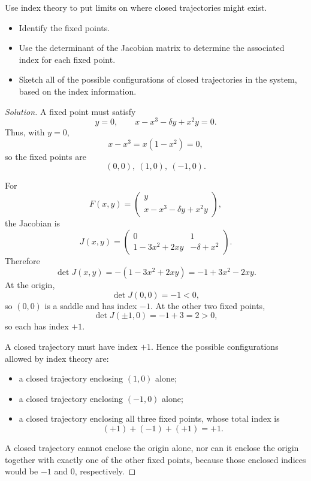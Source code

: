 \documentclass[12pt]{amsart}
\theoremstyle{plain}
\theoremstyle{definition}
\theoremstyle{definition}
\theoremstyle{plain}
\newenvironment{solution}
{\begin{proof}[Solution]}
{\end{proof}}
\begin{document}
\begin{enumerate}[label=\arabic*.]
        Use index theory to put limits on where closed trajectories might exist.
        \begin{itemize}
            \item Identify the fixed points.
            \item Use the determinant of the Jacobian matrix to determine the associated index
            for each fixed point.
            \item Sketch all of the possible configurations of closed trajectories in the system,
            based on the index information.
        \end{itemize}

        \begin{solution}
            A fixed point must satisfy
            \[
                y=0,
                \qquad
                x-x^3-\delta y+x^2y=0.
            \]
            Thus, with $y=0$,
            \[
                x-x^3=x(1-x^2)=0,
            \]
            so the fixed points are
            \[
                (0,0),\ (1,0),\ (-1,0).
            \]

            For
            \[
                F(x,y)=
                \begin{pmatrix}
                    y\\
                    x-x^3-\delta y+x^2y
                \end{pmatrix},
            \]
            the Jacobian is
            \[
                J(x,y)=
                \begin{pmatrix}
                    0 & 1\\
                    1-3x^2+2xy & -\delta+x^2
                \end{pmatrix}.
            \]
            Therefore
            \[
                \det J(x,y)=-(1-3x^2+2xy)=-1+3x^2-2xy.
            \]
            At the origin,
            \[
                \det J(0,0)=-1<0,
            \]
            so $(0,0)$ is a saddle and has index $-1$. At the other two fixed points,
            \[
                \det J(\pm1,0)=-1+3=2>0,
            \]
            so each has index $+1$.

            A closed trajectory must have index $+1$. Hence the possible configurations allowed by index theory are:
            \begin{itemize}
                \item a closed trajectory enclosing $(1,0)$ alone;
                \item a closed trajectory enclosing $(-1,0)$ alone;
                \item a closed trajectory enclosing all three fixed points, whose total index is
                \[
                    (+1)+(-1)+(+1)=+1.
                \]
            \end{itemize}
            A closed trajectory cannot enclose the origin alone, nor can it enclose the origin together with exactly one of the other fixed points, because those enclosed indices would be $-1$ and $0$, respectively.
        \end{solution}


\end{enumerate}
\end{document}
